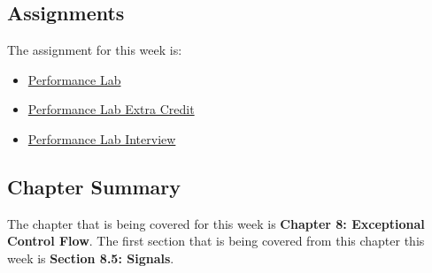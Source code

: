 \subsection{Assignments}

The assignment for this week is:

\begin{itemize}
    \item \href{https://github.com/QuantumCompiler/CU/tree/main/CSPB%202400%20-%20Computer%20Systems/Assignments/Assignment%204%20-%20Performance%20Lab}{Performance Lab}
    \item \href{https://github.com/QuantumCompiler/CU/tree/main/CSPB%202400%20-%20Computer%20Systems/Assignments/Assignment%204%20-%20Performance%20Lab}{Performance Lab Extra Credit}
    \item \href{https://github.com/QuantumCompiler/CU/tree/main/CSPB%202400%20-%20Computer%20Systems/Assignments/Assignment%204%20-%20Performance%20Lab}{Performance Lab Interview}
\end{itemize}

\subsection{Chapter Summary}

The chapter that is being covered for this week is \textbf{Chapter 8: Exceptional Control Flow}. The first section that is being covered from this chapter this week is \textbf{Section 8.5: Signals}.

